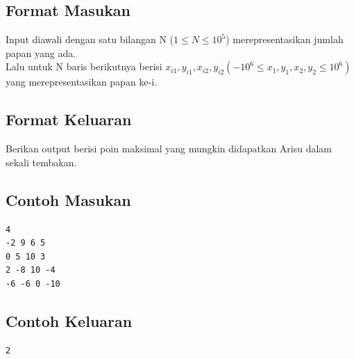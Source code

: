 \documentclass{article}
\begin{document}
\subsection*{Format Masukan}

Input diawali dengan satu bilangan N ($1 \leq N \leq 10^5$) merepresentasikan jumlah papan yang ada.\\

Lalu untuk N baris berikutnya berisi $x_{i1}, y_{i1}, x_{i2}, y_{i2} (-10^6 \leq x_1, y_1, x_2, y_2 \leq 10^6)$ yang merepresentasikan papan ke-i.

\subsection*{Format Keluaran}

Berikan output berisi poin maksimal yang mungkin didapatkan Arisu dalam sekali tembakan.

\begin{multicols}{2}
\subsection*{Contoh Masukan}
\begin{lstlisting}
4
-2 9 6 5
0 5 10 3
2 -8 10 -4
-6 -6 0 -10
\end{lstlisting}
\columnbreak
\subsection*{Contoh Keluaran}
\begin{lstlisting}
2
\end{lstlisting}
\vfill
\null
\end{multicols}
\end{document}
